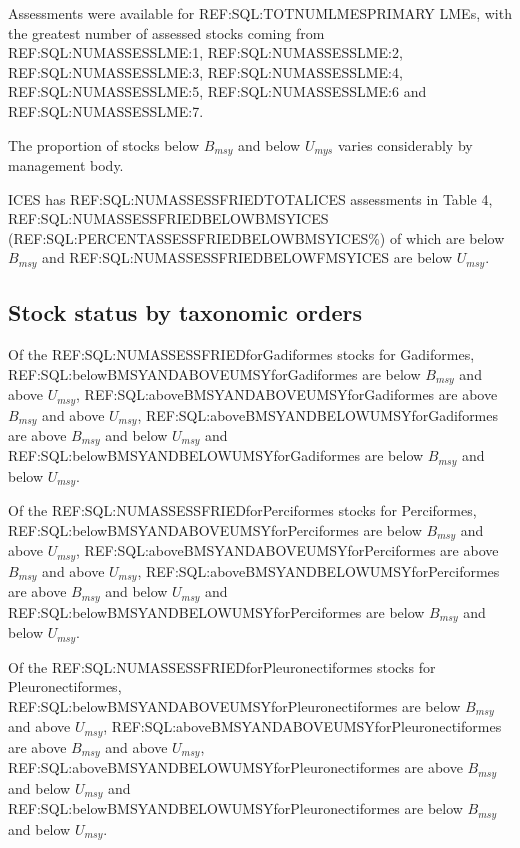

Assessments were available for REF:SQL:TOTNUMLMESPRIMARY LMEs, with the greatest number of
assessed stocks coming from REF:SQL:NUMASSESSLME:1,
REF:SQL:NUMASSESSLME:2, REF:SQL:NUMASSESSLME:3,
REF:SQL:NUMASSESSLME:4, REF:SQL:NUMASSESSLME:5, REF:SQL:NUMASSESSLME:6
and REF:SQL:NUMASSESSLME:7.

The proportion of stocks below $B_{msy}$ and below $U_{mys}$ varies considerably by management body. 

ICES has REF:SQL:NUMASSESSFRIEDTOTALICES assessments in Table 4,
REF:SQL:NUMASSESSFRIEDBELOWBMSYICES
(REF:SQL:PERCENTASSESSFRIEDBELOWBMSYICES\%) of which are below
$B_{msy}$ and REF:SQL:NUMASSESSFRIEDBELOWFMSYICES are below
$U_{msy}$.

\subsection*{Stock status by taxonomic orders}

Of the REF:SQL:NUMASSESSFRIEDforGadiformes stocks for Gadiformes, REF:SQL:belowBMSYANDABOVEUMSYforGadiformes are below $B_{msy}$ and above $U_{msy}$, REF:SQL:aboveBMSYANDABOVEUMSYforGadiformes are above $B_{msy}$ and above $U_{msy}$, REF:SQL:aboveBMSYANDBELOWUMSYforGadiformes are above $B_{msy}$ and below $U_{msy}$ and REF:SQL:belowBMSYANDBELOWUMSYforGadiformes are below $B_{msy}$ and below $U_{msy}$.

Of the REF:SQL:NUMASSESSFRIEDforPerciformes stocks for Perciformes, REF:SQL:belowBMSYANDABOVEUMSYforPerciformes are below $B_{msy}$ and above $U_{msy}$, REF:SQL:aboveBMSYANDABOVEUMSYforPerciformes are above $B_{msy}$ and above $U_{msy}$, REF:SQL:aboveBMSYANDBELOWUMSYforPerciformes are above $B_{msy}$ and below $U_{msy}$ and REF:SQL:belowBMSYANDBELOWUMSYforPerciformes are below $B_{msy}$ and below $U_{msy}$.

Of the REF:SQL:NUMASSESSFRIEDforPleuronectiformes stocks for Pleuronectiformes, REF:SQL:belowBMSYANDABOVEUMSYforPleuronectiformes are below $B_{msy}$ and above $U_{msy}$, REF:SQL:aboveBMSYANDABOVEUMSYforPleuronectiformes are above $B_{msy}$ and above $U_{msy}$, REF:SQL:aboveBMSYANDBELOWUMSYforPleuronectiformes are above $B_{msy}$ and below $U_{msy}$ and REF:SQL:belowBMSYANDBELOWUMSYforPleuronectiformes are below $B_{msy}$ and below $U_{msy}$.

